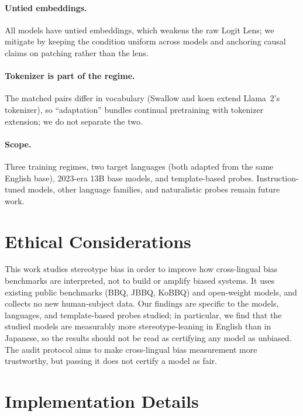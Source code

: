 \documentclass[11pt]{article}
\begin{document}
\paragraph{Untied embeddings.} All models have untied embeddings, which weakens the raw Logit Lens; we mitigate by keeping the condition uniform across models and anchoring causal claims on patching rather than the lens.

\paragraph{Tokenizer is part of the regime.} The matched pairs differ in vocabulary (Swallow and koen extend Llama~2's tokenizer), so ``adaptation'' bundles continual pretraining with tokenizer extension; we do not separate the two.

\paragraph{Scope.} Three training regimes, two target languages (both adapted from the same English base), 2023-era 13B base models, and template-based probes. Instruction-tuned models, other language families, and naturalistic probes remain future work.

\section*{Ethical Considerations}

This work studies stereotype bias in order to improve how cross-lingual bias benchmarks are interpreted, not to build or amplify biased systems. It uses existing public benchmarks (BBQ, JBBQ, KoBBQ) and open-weight models, and collects no new human-subject data. Our findings are specific to the models, languages, and template-based probes studied; in particular, we find that the studied models are measurably more stereotype-leaning in English than in Japanese, so the results should not be read as certifying any model as unbiased. The audit protocol aims to make cross-lingual bias measurement more trustworthy, but passing it does not certify a model as fair.

\balance


\clearpage
\appendix

\section{Implementation Details}
\label{app:implementation}
\end{document}
